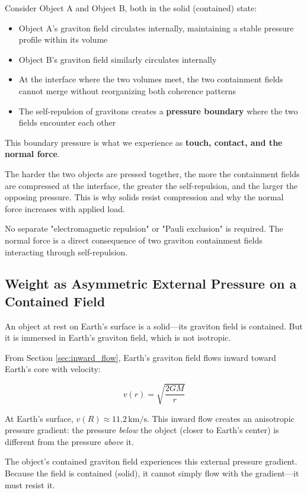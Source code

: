 \documentclass[12pt, a4paper]{article}
\begin{document}
Consider Object A and Object B, both in the solid (contained) state:

\begin{itemize}
    \item Object A's graviton field circulates internally, maintaining a stable pressure profile within its volume
    \item Object B's graviton field similarly circulates internally
    \item At the interface where the two volumes meet, the two containment fields cannot merge without reorganizing both coherence patterns
    \item The self-repulsion of gravitons creates a \textbf{pressure boundary} where the two fields encounter each other
\end{itemize}

This boundary pressure is what we experience as \textbf{touch, contact, and the normal force}.

The harder the two objects are pressed together, the more the containment fields are compressed at the interface, the greater the self-repulsion, and the larger the opposing pressure. This is why solids resist compression and why the normal force increases with applied load.

No separate "electromagnetic repulsion" or "Pauli exclusion" is required. The normal force is a direct consequence of two graviton containment fields interacting through self-repulsion.

\subsection{Weight as Asymmetric External Pressure on a Contained Field}
\label{subsec:weight_asymmetry}

An object at rest on Earth's surface is a solid—its graviton field is contained. But it is immersed in Earth's graviton field, which is not isotropic.

From Section \ref{sec:inward_flow}, Earth's graviton field flows inward toward Earth's core with velocity:

\[
v(r) = \sqrt{\frac{2GM}{r}}
\]

At Earth's surface, \( v(R) \approx 11.2 \, \text{km/s} \). This inward flow creates an anisotropic pressure gradient: the pressure \textit{below} the object (closer to Earth's center) is different from the pressure \textit{above} it.

The object's contained graviton field experiences this external pressure gradient. Because the field is contained (solid), it cannot simply flow with the gradient—it must resist it.
\end{document}
